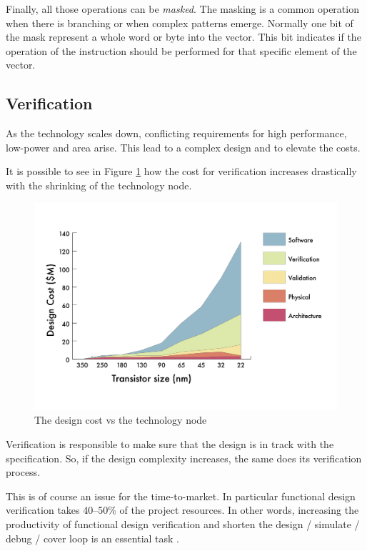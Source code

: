 Finally, all those operations can be \textit{masked}. The masking is a common operation when there is branching or when complex patterns emerge.
Normally one bit of the mask represent a whole word or byte into the vector. This bit indicates if the operation of the instruction should be performed for that specific element of the vector.

\subsection{Verification}
As the technology scales down, conflicting requirements for high performance, low-power and area arise. 
This lead to a complex design and to elevate the costs.

It is possible to see in Figure \ref{verification-tecnology} how the cost for verification increases drastically with the shrinking of the technology node.


\begin{figure}[H]
    \centering
    \includegraphics[scale = 0.4]{Chapter_1/img/cost-scale.png}
    \caption{The design cost vs the technology node \cite{verification-book-2018}}
    \label{verification-tecnology}
\end{figure}

Verification is responsible to make sure that the design is in track with the specification. So, if the design complexity increases, the same does its verification process.

This is of course an issue for the time-to-market. 
In particular functional design verification takes \mbox{40–50\%} of the project resources. In other words, increasing the productivity of functional design verification and shorten the design / simulate / debug / cover loop is an essential task \cite{verification-book-2018}.


